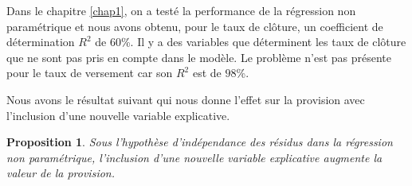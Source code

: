 \documentclass[12pt, a4paper]{book}
\newtheorem{prop}{Proposition}
\begin{document}
{Dans le chapitre \ref{chap1}, on a testé la performance de la régression non paramétrique et nous avons obtenu, pour le taux de clôture, un coefficient de détermination $R^2$ de $60$\%. Il y a des variables que déterminent les taux de clôture que ne sont pas pris en compte dans le modèle. Le problème n'est pas présente pour le taux de versement car son $R^2$ est de $98$\%. 

Nous avons le résultat suivant qui nous donne l'effet sur la provision avec l'inclusion d'une nouvelle variable explicative.


\begin{prop}
Sous l'hypothèse d'indépendance des résidus dans la régression non paramétrique, l'inclusion d'une nouvelle variable explicative augmente la valeur de la provision.
\end{prop}

}
\end{document}
